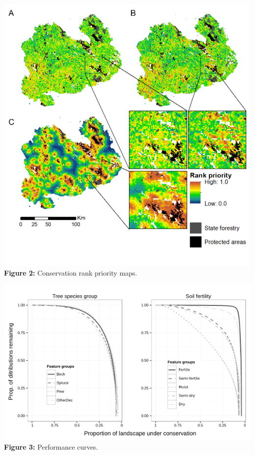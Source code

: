 \documentclass[]{article}
\begin{document}
\includegraphics{figs/Fig2_w500.png}\\\textbf{Figure 2:} Conservation
rank priority maps.

\includegraphics{figs/Fig3_w600.png}\\\textbf{Figure 3:} Performance
curves.
\end{document}
